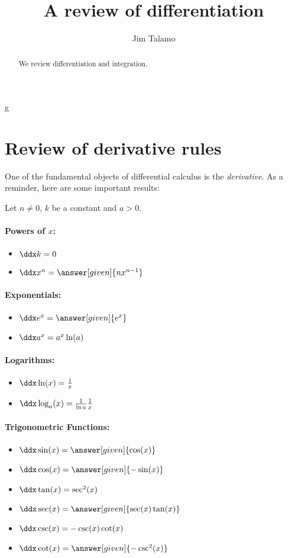 g\documentclass[nooutcomes]{ximera}
\author{Jim Talamo}
\title[Dig-In:]{A review of differentiation}
\begin{document}
\begin{abstract}
  We review differentiation and integration.
\end{abstract}
\maketitle


\section{Review of derivative rules}

One of the fundamental objects of differential calculus is the \emph{derivative}.  As a reminder, here are some important results:


\begin{theorem}
Let $n\ne 0$, $k$ be a constant and $a>0$.


\paragraph{Powers of $x$:}
\begin{itemize}
\item $\ddx k =0$
\item $\ddx x^n  = \answer[given]{n x^{n-1}}$
\end{itemize}

\paragraph{Exponentials:}
\begin{itemize}
\item $\ddx e^x = \answer[given]{e^x}$
\item $\ddx a^x = a^x\ln(a)$
\end{itemize}

\paragraph{Logarithms:}
\begin{itemize}
\item $\ddx \ln(x) = \frac{1}{x}$
\item $\ddx \log_a (x) = \frac{1}{\ln a} \frac{1}{x}$
\end{itemize}

\paragraph{Trigonometric Functions:}
\begin{itemize}
\item $\ddx \sin(x) = \answer[given]{\cos(x)}$
\item $\ddx \cos(x) = \answer[given]{-\sin(x)}$  
\item $\ddx \tan(x) = \sec^2(x)$  
\item $\ddx \sec(x) = \answer[given]{\sec(x)\tan(x)}$ 
\item $\ddx \csc(x) = -\csc(x)\cot(x)$
\item $\ddx \cot(x) = \answer[given]{-\csc^2(x)}$
\end{itemize}


\end{theorem}
\end{document}
